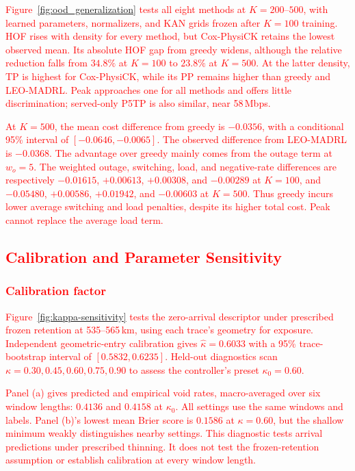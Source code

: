 \documentclass[10pt,letterpaper,journal]{IEEEtran}
\newcommand{\revnew}[1]{\textcolor{red}{#1}}
\begin{document}
\revnew{Figure~\ref{fig:ood_generalization} tests all eight methods at $K=200$--$500$, with learned parameters, normalizers, and KAN grids frozen after $K=100$ training. HOF rises with density for every method, but Cox-PhysiCK retains the lowest observed mean. Its absolute HOF gap from greedy widens, although the relative reduction falls from $34.8\%$ at $K=100$ to $23.8\%$ at $K=500$. At the latter density, TP is highest for Cox-PhysiCK, while its PP remains higher than greedy and LEO-MADRL. Peak approaches one for all methods and offers little discrimination; served-only P5TP is also similar, near 58\,Mbps.}

\revnew{At $K=500$, the mean cost difference from greedy is $-0.0356$, with a conditional 95\% interval of $[-0.0646,-0.0065]$. The observed difference from LEO-MADRL is $-0.0368$. The advantage over greedy mainly comes from the outage term at $w_o=5$. The weighted outage, switching, load, and negative-rate differences are respectively $-0.01615$, $+0.00613$, $+0.00308$, and $-0.00289$ at $K=100$, and $-0.05480$, $+0.00586$, $+0.01942$, and $-0.00603$ at $K=500$. Thus greedy incurs lower average switching and load penalties, despite its higher total cost. Peak cannot replace the average load term.}

\subsection{\revnew{Calibration and Parameter Sensitivity}}
\label{subsec:calibration_sensitivity}

\subsubsection{\revnew{Calibration factor}}
\revnew{Figure~\ref{fig:kappa-sensitivity} tests the zero-arrival descriptor under prescribed frozen retention at 535--565\,km, using each trace's geometry for exposure. Independent geometric-entry calibration gives $\hat\kappa=0.6033$ with a 95\% trace-bootstrap interval of $[0.5832,0.6235]$. Held-out diagnostics scan $\kappa=0.30,0.45,0.60,0.75,0.90$ to assess the controller's preset $\kappa_0=0.60$.}

\revnew{Panel (a) gives predicted and empirical void rates, macro-averaged over six window lengths: $0.4136$ and $0.4158$ at $\kappa_0$. All settings use the same windows and labels. Panel (b)'s lowest mean Brier score is $0.1586$ at $\kappa=0.60$, but the shallow minimum weakly distinguishes nearby settings. This diagnostic tests arrival predictions under prescribed thinning. It does not test the frozen-retention assumption or establish calibration at every window length.}
\end{document}
